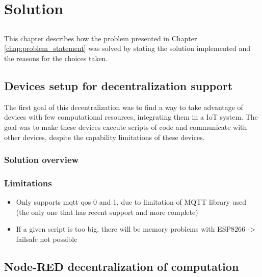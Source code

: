 \chapter{Solution} \label{chap:solution}

\section*{}

This chapter describes how the problem presented in Chapter \ref{chap:problem_statement} was solved by stating the solution implemented and the reasons for the choices taken.  

\section{Devices setup for decentralization support}\label{sec:devices_decentralization}

The first goal of this decentralization was to find a way to take advantage of devices with few computational resources, integrating them in a IoT system. The goal was to make these devices execute scripts of code and communicate with other devices, despite the capability limitations of these devices.

\subsection{Solution overview}


\subsection{Limitations}

\begin{itemize}
    \item Only supports mqtt qos 0 and 1, due to limitation of MQTT library used (the only one that has recent support and more complete)
    \item If a given script is too big, there will be memory problems with ESP8266 -> failsafe not possible
\end{itemize}

\section{Node-RED decentralization of computation}\label{sec:node_red_decentralization}

